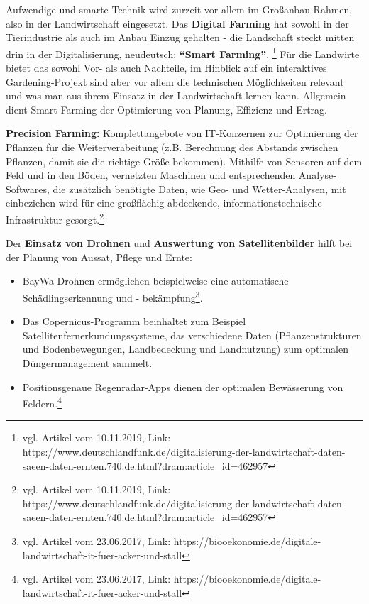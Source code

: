 Aufwendige und smarte Technik wird zurzeit vor allem im
Großanbau-Rahmen, also in der Landwirtschaft eingesetzt. Das
\textbf{Digital Farming} hat sowohl in der Tierindustrie als auch im
Anbau Einzug gehalten - die Landschaft steckt mitten drin in der
Digitalisierung, neudeutsch: \textbf{``Smart Farming''}. \footnote{vgl.
  Artikel vom 10.11.2019, Link:
  https://www.deutschlandfunk.de/digitalisierung-der-landwirtschaft-daten-saeen-daten-ernten.740.de.html?dram:article\_id=462957}
Für die Landwirte bietet das sowohl Vor- als auch Nachteile, im Hinblick
auf ein interaktives Gardening-Projekt sind aber vor allem die
technischen Möglichkeiten relevant und was man aus ihrem Einsatz in der
Landwirtschaft lernen kann. Allgemein dient Smart Farming der
Optimierung von Planung, Effizienz und Ertrag.

\textbf{Precision Farming:} Komplettangebote von IT-Konzernen zur
Optimierung der Pflanzen für die Weiterverabeitung (z.B. Berechnung des
Abstands zwischen Pflanzen, damit sie die richtige Größe bekommen).
Mithilfe von Sensoren auf dem Feld und in den Böden, vernetzten
Maschinen und entsprechenden Analyse-Softwares, die zusätzlich benötigte
Daten, wie Geo- und Wetter-Analysen, mit einbeziehen wird für eine
großflächig abdeckende, informationstechnische Infrastruktur
gesorgt.\footnote{vgl. Artikel vom 10.11.2019, Link:
  https://www.deutschlandfunk.de/digitalisierung-der-landwirtschaft-daten-saeen-daten-ernten.740.de.html?dram:article\_id=462957}

Der \textbf{Einsatz von Drohnen} und \textbf{Auswertung von
Satellitenbilder} hilft bei der Planung von Aussat, Pflege und Ernte:

\begin{itemize}
\tightlist
\item
  BayWa-Drohnen ermöglichen beispielweise eine automatische
  Schädlingserkennung und - bekämpfung\footnote{vgl. Artikel vom
    23.06.2017, Link:
    https://biooekonomie.de/digitale-landwirtschaft-it-fuer-acker-und-stall}.
\item
  Das Copernicus-Programm beinhaltet zum Beispiel
  Satellitenfernerkundungssysteme, das verschiedene Daten
  (Pflanzenstrukturen und Bodenbewegungen, Landbedeckung und
  Landnutzung) zum optimalen Düngermanagement sammelt.
\item
  Positionsgenaue Regenradar-Apps dienen der optimalen Bewässerung von
  Feldern.\footnote{vgl. Artikel vom 23.06.2017, Link:
    https://biooekonomie.de/digitale-landwirtschaft-it-fuer-acker-und-stall}
\end{itemize}

